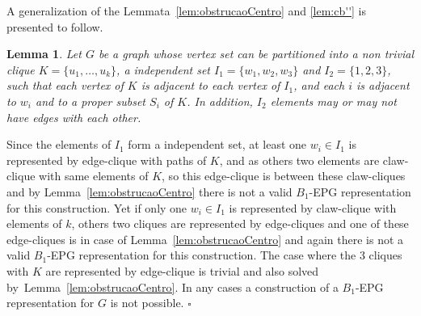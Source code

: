 \documentclass[9pt]{entcs}
\newtheorem{lema}{Lemma}[section]
\newtheorem{defi}{Definition}[section]
\begin{document}
A generalization of the Lemmata~\ref{lem:obstrucaoCentro} and \ref{lem:cb''} is presented to follow.

\begin{lema}\label{lem:obstrucaoGeneralizada}
Let $G$ be a graph whose vertex set  can be
partitioned into a non trivial clique $K=\{u_1,\ldots,u_k\}$, a independent set $I_1=\{w_1,w_2,w_3\}$  and
$I_2=\{1,2,3\}$, such that each vertex of $K$ is adjacent to each vertex of $I_1$, and each  $i$ is adjacent to $w_i$ and to a proper subset $S_i$ of $K$. In addition, $I_2$ elements may or may not have edges with each other.
\end{lema}

\begin{pf}
Since the elements of $I_1$ form a independent set, at least one $w_i \in I_1$ is represented by edge-clique with paths of $K$, and as others two elements are claw-clique with same elements of $K$, so this edge-clique is between these claw-cliques and by Lemma~\ref{lem:obstrucaoCentro} there is not a valid $B_1$-EPG representation for this construction. Yet if only one $w_i\in I_1$ is represented by claw-clique with elements of $k$, others two cliques are represented by edge-cliques and one of these edge-cliques is in case of Lemma~\ref{lem:obstrucaoCentro} and again there is not a valid $B_1$-EPG representation for this construction. 
The case where the 3 cliques with $K$ are represented by edge-clique is trivial and also solved by~Lemma~\ref{lem:obstrucaoCentro}. In any cases a construction of a $B_1$-EPG representation for $G$ is not possible.
 $\square$\end{pf}


\end{document}
